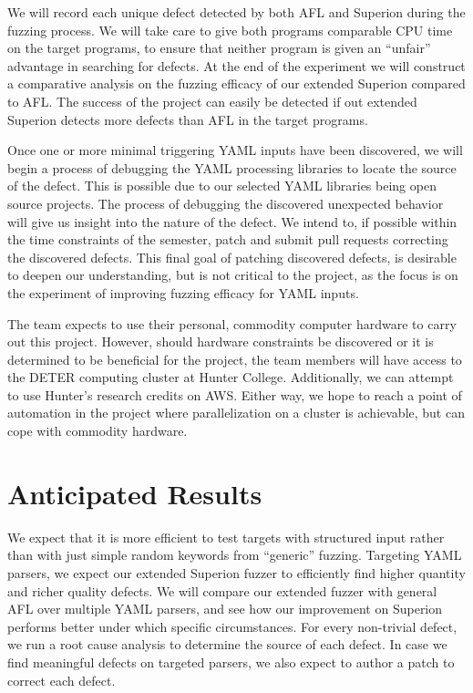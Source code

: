 \documentclass[12pt]{diazessay}
\begin{document}
We will record each unique defect detected by both AFL and Superion during the fuzzing process.
We will take care to give both programs comparable CPU time on the target programs, to ensure that neither program is given an ``unfair'' advantage in searching for defects.
At the end of the experiment we will construct a comparative analysis on the fuzzing efficacy of our extended Superion compared to AFL.
The success of the project can easily be detected if out extended Superion detects more defects than AFL in the target programs.

Once one or more minimal triggering YAML inputs have been discovered, we will begin a process of debugging the YAML processing libraries to locate the source of the defect.
This is possible due to our selected YAML libraries being open source projects.
The process of debugging the discovered unexpected behavior will give us insight into the nature of the defect.
We intend to, if possible within the time constraints of the semester, patch and submit pull requests correcting the discovered defects.
This final goal of patching discovered defects, is desirable to deepen our understanding, but is not critical to the project, as the focus is on the experiment of improving fuzzing efficacy for YAML inputs.

The team expects to use their personal, commodity computer hardware to carry out this project.
However, should hardware constraints be discovered or it is determined to be beneficial for the project, the team members will have access to the DETER computing cluster at Hunter College.
Additionally, we can attempt to use Hunter's research credits on AWS.
Either way, we hope to reach a point of automation in the project where parallelization on a cluster is achievable, but can cope with commodity hardware.

\vspace{-0.25cm}
\section*{Anticipated Results}
\label{results}
\vspace{-0.25cm}

We expect that it is more efficient to test targets with structured input rather than with just simple random keywords from ``generic'' fuzzing.
Targeting YAML parsers, we expect our extended Superion fuzzer to efficiently find higher quantity and richer quality defects.
We will compare our extended fuzzer with general AFL over multiple YAML parsers, and see how our improvement on Superion performs better under which specific circumstances.
For every non-trivial defect, we run a root cause analysis to determine the source of each defect.
In case we find meaningful defects on targeted parsers, we also expect to author a patch to correct each defect.
\end{document}

